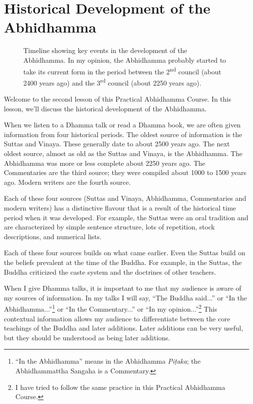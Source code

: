 \section{Historical Development of the Abhidhamma}

\begin{figure}[h]
\centering

\caption{Timeline showing key events in the development of the Abhidhamma. In my opinion, the Abhidhamma probably started to take its current form in the period between the 2\textsuperscript{nd} council (about 2400 years ago) and the 3\textsuperscript{rd} council (about 2250 years ago).}
\label{fig:Timeline}
\end{figure}

Welcome to the second lesson of this Practical Abhidhamma Course. In this lesson, we'll discuss the historical development of the Abhidhamma.

When we listen to a Dhamma talk or read a Dhamma book, we are often given information from four historical periods. The oldest source of information is the Suttas and Vinaya. These generally date to about 2500 years ago. The next oldest source, almost as old as the Suttas and Vinaya, is the Abhidhamma. The Abhidhamma was more or less complete about 2250 years ago. The Commentaries are the third source; they were compiled about 1000 to 1500 years ago. Modern writers are the fourth source. 

Each of these four sources (Suttas and Vinaya, Abhidhamma, Commentaries and modern writers) has a distinctive flavour that is a result of the historical time period when it was developed. For example, the Suttas were an oral tradition and are characterized by simple sentence structure, lots of repetition, stock descriptions, and numerical lists. 

Each of these four sources builds on what came earlier. Even the Suttas build on the beliefs prevalent at the time of the Buddha. For example, in the Suttas, the Buddha criticized the caste system and the doctrines of other teachers. 

When I give Dhamma talks, it is important to me that my audience is aware of my sources of information. In my talks I will say, “The Buddha said...” or “In the Abhidhamma...”\footnote{“In the Abhidhamma” means in the Abhidhamma \textit{Piṭaka}; the Abhidhammattha Sangaha is a Commentary.} or “In the Commentary...” or “In my opinion...”\footnote{I have tried to follow the same practice in this Practical Abhidhamma Course.} This contextual information allows my audience to differentiate between the core teachings of the Buddha and later additions. Later additions can be very useful, but they should be understood as being later additions.

